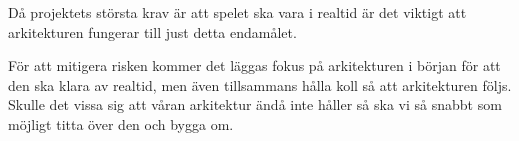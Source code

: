 {
    Då projektets största krav är att spelet ska vara i realtid är det viktigt att arkitekturen fungerar till just
    detta endamålet.

    För att mitigera risken kommer det läggas fokus på arkitekturen i början för att den ska klara av realtid, 
    men även tillsammans hålla koll så att arkitekturen följs.
    Skulle det vissa sig att våran arkitektur ändå inte håller så ska vi så snabbt som möjligt titta över den och bygga om.
}

{

}

{

}

{

}

{

}

{

}

